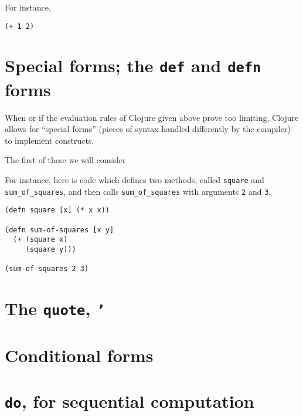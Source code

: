 \documentclass[11pt]{article}
\begin{document}
For instance,
\begin{verbatim}
(+ 1 2)
\end{verbatim}

\section{Special forms; the \texttt{def} and \texttt{defn} forms}
\label{sec:org56cf162}
When or if the evaluation rules of Clojure given above
prove too limiting, Clojure allows for “special forms”
(pieces of syntax handled differently by the compiler)
to implement constructs.

The first of these we will consider 

For instance, here is code which defines two methods,
called \texttt{square} and \texttt{sum\_of\_squares},
and then calls \texttt{sum\_of\_squares} with arguments \texttt{2} and \texttt{3}.
\begin{verbatim}
(defn square [x] (* x x))

(defn sum-of-squares [x y]
  (+ (square x)
     (square y)))

(sum-of-squares 2 3)
\end{verbatim}

\section{The \texttt{quote}, \texttt{'}}
\label{sec:orge70f9b5}

\section{Conditional forms}
\label{sec:org1760a3e}

\section{\texttt{do}, for sequential computation}
\label{sec:orgac39450}
\end{document}
